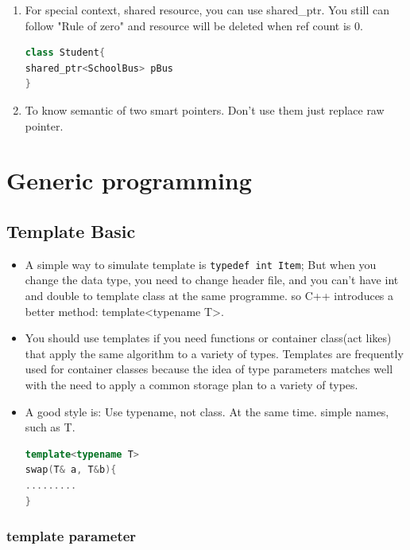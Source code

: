 \documentclass[a4paper,12pt,twoside]{book}
\begin{document}
\begin{itemize}
\begin{enumerate}
\item For special context, shared resource, you can use shared\_ptr.  You still can follow "Rule of zero" and resource will be deleted when ref count is 0.
\begin{lstlisting}[frame=single, language=c++]
class Student{
shared_ptr<SchoolBus> pBus
}
\end{lstlisting}

\item To know semantic of two smart pointers. Don't use them just replace raw pointer.
\end{enumerate}

\end{itemize}

\section{Generic programming}
\subsection{Template Basic}
\begin{itemize}
\item A simple way to simulate template is \verb=typedef int Item=; But when you change the data type, you need to change header file, and you can't have int and double to template class at the same programme. so C++ introduces a better method: template<typename T>.

\item You should use templates if you need functions or container class(act likes) that apply the same algorithm to a variety of types. Templates are frequently used for container classes because the idea of type parameters matches well with the need to apply a common storage plan to a variety of types.

\item A good style is: Use typename, not class. At the same time. simple names, such as T.
\begin{lstlisting}[frame=single, language=c++]
template<typename T> 
swap(T& a, T&b){
.........
}
\end{lstlisting}

\end{itemize}

\subsubsection{template parameter}
\end{document}
